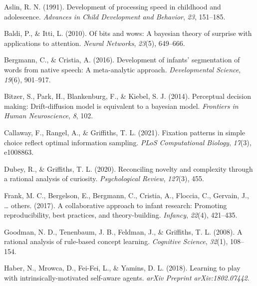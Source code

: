 \documentclass[10pt, letterpaper]{article}
\newenvironment{CSLReferences}%
  {}%
  {\par}
\begin{document}
\hypertarget{refs}{}
\begin{CSLReferences}{1}{0}
\leavevmode{}%
Aslin, R. N. (1991). Development of processing speed in childhood and
adolescence. \emph{Advances in Child Development and Behavior},
\emph{23}, 151--185.

\leavevmode{}%
Baldi, P., \& Itti, L. (2010). Of bits and wows: A bayesian theory of
surprise with applications to attention. \emph{Neural Networks},
\emph{23}(5), 649--666.

\leavevmode{}%
Bergmann, C., \& Cristia, A. (2016). Development of infants'
segmentation of words from native speech: A meta-analytic approach.
\emph{Developmental Science}, \emph{19}(6), 901--917.

\leavevmode{}%
Bitzer, S., Park, H., Blankenburg, F., \& Kiebel, S. J. (2014).
Perceptual decision making: Drift-diffusion model is equivalent to a
bayesian model. \emph{Frontiers in Human Neuroscience}, \emph{8}, 102.

\leavevmode{}%
Callaway, F., Rangel, A., \& Griffiths, T. L. (2021). Fixation patterns
in simple choice reflect optimal information sampling. \emph{PLoS
Computational Biology}, \emph{17}(3), e1008863.

\leavevmode{}%
Dubey, R., \& Griffiths, T. L. (2020). Reconciling novelty and
complexity through a rational analysis of curiosity. \emph{Psychological
Review}, \emph{127}(3), 455.

\leavevmode{}%
Frank, M. C., Bergelson, E., Bergmann, C., Cristia, A., Floccia, C.,
Gervain, J., \ldots{} others. (2017). A collaborative approach to infant
research: Promoting reproducibility, best practices, and
theory-building. \emph{Infancy}, \emph{22}(4), 421--435.

\leavevmode{}%
Goodman, N. D., Tenenbaum, J. B., Feldman, J., \& Griffiths, T. L.
(2008). A rational analysis of rule-based concept learning.
\emph{Cognitive Science}, \emph{32}(1), 108--154.

\leavevmode{}%
Haber, N., Mrowca, D., Fei-Fei, L., \& Yamins, D. L. (2018). Learning to
play with intrinsically-motivated self-aware agents. \emph{arXiv
Preprint arXiv:1802.07442}.


\end{CSLReferences}
\end{document}
